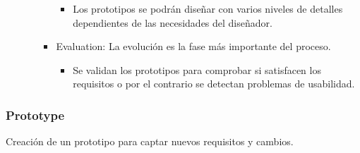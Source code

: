 \documentclass[12pt, twoside, openright]{report} %
\begin{document}
\begin{itemize}
\begin{itemize}
\begin{itemize}
          \begin{itemize}
          
          \item
            Los prototipos se podrán diseñar con varios niveles de
            detalles dependientes de las necesidades del diseñador.
          \end{itemize}
        \item
          Evaluation: La evolución es la fase más importante del
          proceso.

          \begin{itemize}
          
          \item
            Se validan los prototipos para comprobar si satisfacen los
            requisitos o por el contrario se detectan problemas de
            usabilidad.
          \end{itemize}
        \end{itemize}
      \end{itemize}
    \end{itemize}

\subsubsection{Prototype}
Creación de un prototipo para captar nuevos requisitos y
    cambios.
\end{document}
